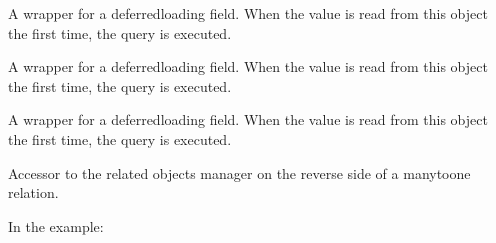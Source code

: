 \documentclass[letterpaper,10pt,english]{sphinxmanual}
\begin{document}
\begin{fulllineitems}

\begin{fulllineitems}
\label{\detokenize{accounts:accounts.models.User.about}}
A wrapper for a deferred\sphinxhyphen{}loading field. When the value is read from this
object the first time, the query is executed.

\end{fulllineitems}


\begin{fulllineitems}
\label{\detokenize{accounts:accounts.models.User.auto_amount}}
A wrapper for a deferred\sphinxhyphen{}loading field. When the value is read from this
object the first time, the query is executed.

\end{fulllineitems}


\begin{fulllineitems}
\label{\detokenize{accounts:accounts.models.User.bbo_name}}
A wrapper for a deferred\sphinxhyphen{}loading field. When the value is read from this
object the first time, the query is executed.

\end{fulllineitems}


\begin{fulllineitems}
\label{\detokenize{accounts:accounts.models.User.comment1_set}}
Accessor to the related objects manager on the reverse side of a
many\sphinxhyphen{}to\sphinxhyphen{}one relation.

In the example:

\begin{sphinxVerbatim}[commandchars=\\\{\}]
 
       
\end{sphinxVerbatim}


\end{fulllineitems}
\end{fulllineitems}
\end{document}
